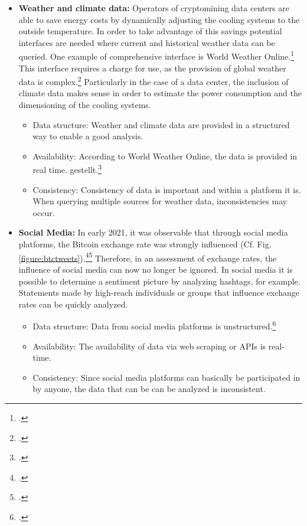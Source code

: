 \begin{itemize}
    \item \textbf{Weather and climate data: }Operators of cryptomining data centers are able to save energy costs by dynamically adjusting the
    cooling systems to the outside temperature. In order to take advantage of this savings potential
    interfaces are needed where current and historical weather data can be queried. One example of
    comprehensive interface is World Weather Online.\footcite[Cf.][]{wwo2021api} This interface requires a charge
    for use, as the provision of global weather data is complex.\footcite[Cf.][]{wwo2021pricing} Particularly in the case of a
    data center, the inclusion of climate data makes sense in order to estimate the power consumption and the dimensioning of the cooling systems.
    \begin{itemize}
        \item Data structure: Weather and climate data are provided in a structured way to enable a good analysis.
        \item Availability: According to World Weather Online, the data is provided in real time.
        gestellt.\footcite[Cf.][]{wwo2021api}
        \item Consistency: Consistency of data is important and within a platform it is. When querying
        multiple sources for weather data, inconsistencies may occur.
    \end{itemize}
    \item \textbf{Social Media: }In early 2021, it was observable that through social media platforms, the Bitcoin
    exchange rate was strongly influenced
    (Cf. Fig. \ref{figure:btctweets}).\footcite[Cf.][]{forbes2021musk}\footcite[Cf.][pp. 1]{ante2021elon} Therefore, in
    an assessment of exchange rates, the influence of social media can now no longer be ignored. In social media
    it is possible to determine a sentiment picture by analyzing hashtags, for example. Statements made by
    high-reach individuals or groups that influence exchange rates can be quickly analyzed.
    \begin{itemize}
        \item Data structure: Data from social media platforms is unstructured.\footcite[Cf.][p. 27]{kimble2015big}
        \item Availability: The availability of data via web scraping or \acp{API} is real-time.
        \item Consistency: Since social media platforms can basically be participated in by anyone, the data that can be
        can be analyzed is inconsistent.
    \end{itemize}
\end{itemize}

